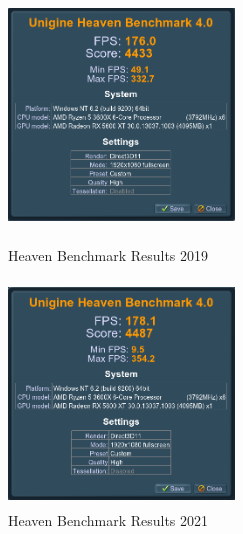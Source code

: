 \documentclass{report}
\begin{document}
\begin{center}
\begin{enumerate}
	\begin{figure}[h]
		\center
		\includegraphics[width=6cm, height=6cm]{Imagens/HeavenDX11_0.png}
		\caption{Heaven Benchmark Results 2019}
		\includegraphics[width=6cm, height=6cm]{Imagens/HeavenDX11.png}
		\caption{Heaven Benchmark Results 2021}
		\label{fig.heaven}
	\end{figure}
\end{enumerate}
\end{center} 
\vspace{20cm}
\end{document}
